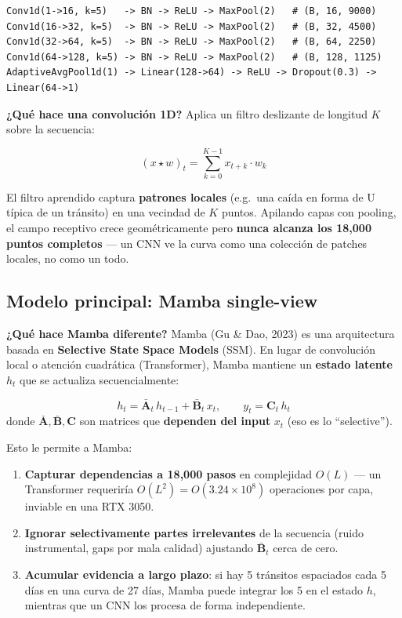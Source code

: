 \documentclass[11pt, a4paper]{article}
\begin{document}
\begin{lstlisting}[basicstyle=\ttfamily\footnotesize]
Conv1d(1->16, k=5)   -> BN -> ReLU -> MaxPool(2)   # (B, 16, 9000)
Conv1d(16->32, k=5)  -> BN -> ReLU -> MaxPool(2)   # (B, 32, 4500)
Conv1d(32->64, k=5)  -> BN -> ReLU -> MaxPool(2)   # (B, 64, 2250)
Conv1d(64->128, k=5) -> BN -> ReLU -> MaxPool(2)   # (B, 128, 1125)
AdaptiveAvgPool1d(1) -> Linear(128->64) -> ReLU -> Dropout(0.3) -> Linear(64->1)
\end{lstlisting}

\textbf{¿Qué hace una convolución 1D?} Aplica un filtro deslizante de longitud $K$ sobre la secuencia:

$$
(x \star w)_t = \sum_{k=0}^{K-1} x_{t+k} \cdot w_k
$$

El filtro aprendido captura \textbf{patrones locales} (e.g.\ una caída en forma de U típica de un tránsito) en una vecindad de $K$ puntos. Apilando capas con pooling, el campo receptivo crece geométricamente pero \textbf{nunca alcanza los 18,000 puntos completos} --- un CNN ve la curva como una colección de patches locales, no como un todo.

\subsection{Modelo principal: Mamba single-view}

\textbf{¿Qué hace Mamba diferente?} Mamba (Gu \& Dao, 2023) es una arquitectura basada en \textbf{Selective State Space Models} (SSM). En lugar de convolución local o atención cuadrática (Transformer), Mamba mantiene un \textbf{estado latente $h_t$} que se actualiza secuencialmente:

\begin{keybox}
$$
h_t = \bar{\mathbf{A}}_t \, h_{t-1} + \bar{\mathbf{B}}_t \, x_t, \qquad y_t = \mathbf{C}_t \, h_t
$$
donde $\bar{\mathbf{A}}, \bar{\mathbf{B}}, \mathbf{C}$ son matrices que \textbf{dependen del input} $x_t$ (eso es lo ``selective'').
\end{keybox}

Esto le permite a Mamba:

\begin{enumerate}[leftmargin=*, topsep=0pt]
    \item \textbf{Capturar dependencias a 18,000 pasos} en complejidad $O(L)$ --- un Transformer requeriría $O(L^2) = O(3.24 \times 10^8)$ operaciones por capa, inviable en una RTX 3050.
    \item \textbf{Ignorar selectivamente partes irrelevantes} de la secuencia (ruido instrumental, gaps por mala calidad) ajustando $\bar{\mathbf{B}}_t$ cerca de cero.
    \item \textbf{Acumular evidencia a largo plazo}: si hay 5 tránsitos espaciados cada 5 días en una curva de 27 días, Mamba puede integrar los 5 en el estado $h$, mientras que un CNN los procesa de forma independiente.
\end{enumerate}
\end{document}
